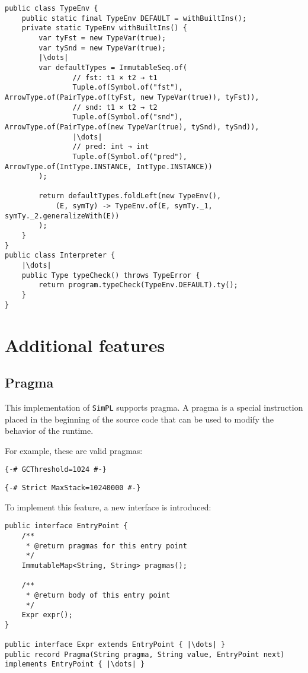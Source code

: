 \documentclass[a4paper]{article}
\begin{document}
\begin{verbatim}
public class TypeEnv {
    public static final TypeEnv DEFAULT = withBuiltIns();
    private static TypeEnv withBuiltIns() {
        var tyFst = new TypeVar(true);
        var tySnd = new TypeVar(true);
        |\dots|
        var defaultTypes = ImmutableSeq.of(
                // fst: t1 × t2 → t1
                Tuple.of(Symbol.of("fst"), ArrowType.of(PairType.of(tyFst, new TypeVar(true)), tyFst)),
                // snd: t1 × t2 → t2
                Tuple.of(Symbol.of("snd"), ArrowType.of(PairType.of(new TypeVar(true), tySnd), tySnd)),
                |\dots|
                // pred: int → int
                Tuple.of(Symbol.of("pred"), ArrowType.of(IntType.INSTANCE, IntType.INSTANCE))
        );

        return defaultTypes.foldLeft(new TypeEnv(),
            (E, symTy) -> TypeEnv.of(E, symTy._1, symTy._2.generalizeWith(E))
        );
    }
}
public class Interpreter {
    |\dots|
    public Type typeCheck() throws TypeError {
        return program.typeCheck(TypeEnv.DEFAULT).ty();
    }
}
\end{verbatim}

\section{Additional features}

\subsection{Pragma}

This implementation of \texttt{SimPL} supports pragma. A pragma is a special instruction placed in the beginning of the source code that can be used to modify the behavior of the runtime.

For example, these are valid pragmas:

\texttt{\{-\# GCThreshold=1024 \#-\}}

\texttt{\{-\# Strict MaxStack=10240000 \#-\}}

To implement this feature, a new interface is introduced:

\begin{verbatim}
public interface EntryPoint {
    /**
     * @return pragmas for this entry point
     */
    ImmutableMap<String, String> pragmas();

    /**
     * @return body of this entry point
     */
    Expr expr();
}

public interface Expr extends EntryPoint { |\dots| }
public record Pragma(String pragma, String value, EntryPoint next) implements EntryPoint { |\dots| }
\end{verbatim}
\end{document}
